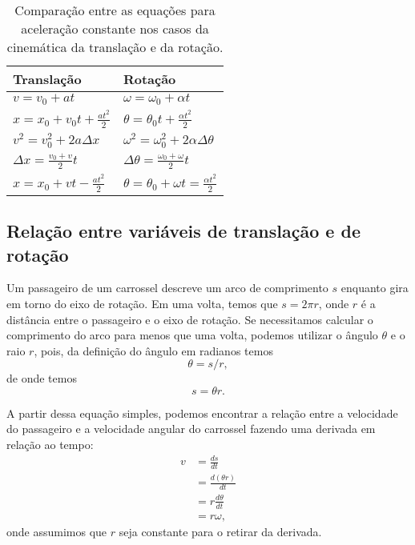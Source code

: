 \begin{table}[!h]
\centering
\caption{Comparação entre as equações para aceleração constante nos casos da cinemática da translação e da rotação.\label{Tab:CompEqsTransRot}}
\begin{tabular}{ll}
\toprule
Translação & Rotação \\
\midrule
$v = v_0 + at$ & $\omega = \omega_0 + \alpha t$ \\
$x = x_0 + v_0 t +\frac{at^2}{2}$ & $\theta = \theta_0 t + \frac{\alpha t^2}{2}$ \\
$v^2 = v_0^2 + 2 a \Delta x$ & $\omega^2 = \omega_0^2 + 2\alpha \Delta\theta$ \\
$\Delta x = \frac{v_0 + v}{2} t$ & $\Delta\theta = \frac{\omega_0 + \omega}{2} t$ \\
$x = x_0 + vt - \frac{at^2}{2}$ & $\theta = \theta_0 + \omega t = \frac{\alpha t^2}{2}$ \\
\bottomrule
\end{tabular}
\end{table}

\subsection{Relação entre variáveis de translação e de rotação}

Um passageiro de um carrossel descreve um arco de comprimento $s$ enquanto gira em torno do eixo de rotação. Em uma volta, temos que $s = 2\pi r$, onde $r$ é a distância entre o passageiro e o eixo de rotação. Se necessitamos calcular o comprimento do arco para menos que uma volta, podemos utilizar o ângulo $\theta$ e o raio $r$, pois, da definição do ângulo em radianos temos
\begin{equation}
	\theta = s/r,
\end{equation}
%
de onde temos
\begin{equation}
	s = \theta r.
\end{equation}

A partir dessa equação simples, podemos encontrar a relação entre a velocidade do passageiro e a velocidade angular do carrossel fazendo uma derivada em relação ao tempo:
\begin{align}
	v &= \frac{ds}{dt} \\
	&= \frac{d(\theta r)}{dt} \\
	&= r\frac{d\theta}{dt} \\
	&= r\omega,
\end{align}
%
onde assumimos que $r$ seja constante para o retirar da derivada.

